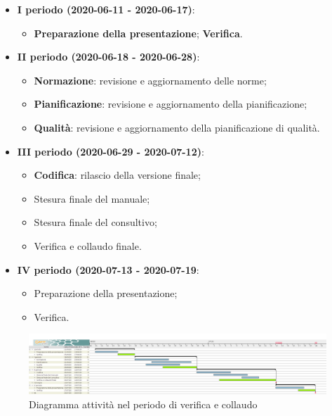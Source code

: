 \documentclass[../piano-di-progetto.tex]{subfiles}
\begin{document}
\begin{itemize}
    \item \textbf{I periodo (2020-06-11 - 2020-06-17)}:
        \begin{itemize}
            \item \textbf{Preparazione della presentazione};
            \textbf{Verifica}.
        \end{itemize}
    \item \textbf{II periodo (2020-06-18 - 2020-06-28)}:
        \begin{itemize}
            \item \textbf{Normazione}: revisione e aggiornamento delle norme;
            \item \textbf{Pianificazione}: revisione e aggiornamento della pianificazione;
            \item \textbf{Qualità}: revisione e aggiornamento della pianificazione di qualità.
        \end{itemize}
    \item \textbf{III periodo (2020-06-29 - 2020-07-12)}:
        \begin{itemize}
            \item \textbf{Codifica}: rilascio della versione finale;
            \item Stesura finale del manuale;
            \item Stesura finale del consultivo;
            \item Verifica e collaudo finale.
        \end{itemize}
    \item \textbf{IV periodo (2020-07-13 - 2020-07-19}:
        \begin{itemize}
            \item Preparazione della presentazione;
            \item Verifica.
        \end{itemize}
\end{itemize}

\newpage
\begin{landscape}
    \begin{figure}[H]
        \centering
        \includegraphics[width=24cm]{img/verifica.png}
        \caption{Diagramma attività nel periodo di verifica e collaudo}
      \end{figure}
\end{landscape}
\end{document}
